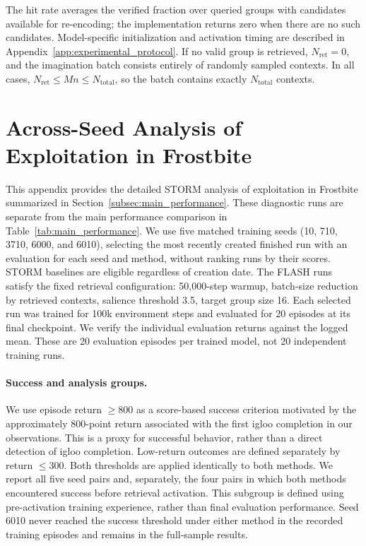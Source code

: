 \documentclass{article} %
\begin{document}
The hit rate averages the verified fraction over queried groups with candidates available for re-encoding; the implementation returns zero when there are no such candidates. Model-specific initialization and activation timing are described in Appendix~\ref{app:experimental_protocol}. If no valid group is retrieved, $N_{\text{ret}}=0$, and the imagination batch consists entirely of randomly sampled contexts. In all cases, $N_{\text{ret}}\leq Mn\leq N_{\text{total}}$, so the batch contains exactly $N_{\text{total}}$ contexts.
\FloatBarrier

\onecolumn

\section{Across-Seed Analysis of Exploitation in Frostbite}
\label{sec:appendix_exploitation}


This appendix provides the detailed STORM analysis of exploitation in Frostbite summarized in Section~\ref{subsec:main_performance}. These diagnostic runs are separate from the main performance comparison in Table~\ref{tab:main_performance}. We use five matched training seeds (10, 710, 3710, 6000, and 6010), selecting the most recently created finished run with an evaluation for each seed and method, without ranking runs by their scores. STORM baselines are eligible regardless of creation date. The FLASH runs satisfy the fixed retrieval configuration: 50,000-step warmup, batch-size reduction by retrieved contexts, salience threshold 3.5, target group size 16. Each selected run was trained for 100k environment steps and evaluated for 20 episodes at its final checkpoint. We verify the individual evaluation returns against the logged mean. These are 20 evaluation episodes per trained model, not 20 independent training runs.

\paragraph{Success and analysis groups.}
We use episode return $\geq 800$ as a score-based success criterion motivated by the approximately 800-point return associated with the first igloo completion in our observations. This is a proxy for successful behavior, rather than a direct detection of igloo completion. Low-return outcomes are defined separately by return $\leq 300$. Both thresholds are applied identically to both methods. We report all five seed pairs and, separately, the four pairs in which both methods encountered success before retrieval activation. This subgroup is defined using pre-activation training experience, rather than final evaluation performance. Seed 6010 never reached the success threshold under either method in the recorded training episodes and remains in the full-sample results.
\end{document}
